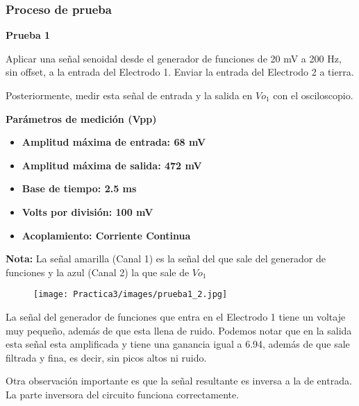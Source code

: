 \documentclass[12pt]{article}
\begin{document}
	\subsubsection{Proceso de prueba}
	\textbf{Prueba 1}
	
	Aplicar una señal senoidal desde el generador de funciones de 20 mV a 200 Hz, sin offset, a la entrada del Electrodo 1. Enviar la entrada del Electrodo 2 a tierra.
	
	Posteriormente, medir esta señal de entrada y la salida en $Vo_{1}$ con el osciloscopio.
	
	\textbf{Parámetros de medición (Vpp)}
            \begin{multicols}{2}
                \begin{itemize}
                    \item[\checkmark] \textbf{Amplitud máxima de entrada: 68 mV}
                    \item[\checkmark] \textbf{Amplitud máxima de salida: 472 mV}
                    \item[\checkmark] \textbf{Base de tiempo: 2.5 ms}
            \columnbreak
                    \item[\checkmark] \textbf{Volts por división: 100 mV}
                    \item[\checkmark] \textbf{Acoplamiento: Corriente Continua}
                \end{itemize}
            \end{multicols}
            
            \textbf{Nota:} La señal amarilla (Canal 1) es la señal del que sale del generador de funciones y la azul (Canal 2) la que sale de $Vo_{1}$
            
	        \begin{figure}[h!]
                \centering
                \texttt{[image: Practica3/images/prueba1\_2.jpg]}
            \end{figure} 
            
            La señal del generador de funciones que entra en el Electrodo 1 tiene un voltaje muy pequeño, además de que esta llena de ruido. Podemos notar que en la salida esta señal esta amplificada y tiene una ganancia igual a 6.94, además de que sale filtrada y fina, es decir, sin picos altos ni ruido.
            
            Otra observación importante es que la señal resultante es inversa a la de entrada. La parte inversora del circuito funciona correctamente.
	
\end{document}
